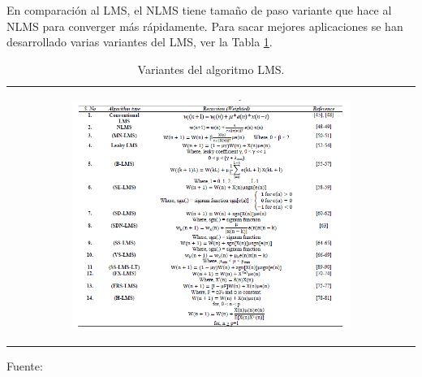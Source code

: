\begin{enumerate}
\begin{enumerate}
\begin{enumerate}
En comparación al LMS, el NLMS tiene tamaño de paso variante que hace al NLMS para converger más rápidamente. Para sacar mejores aplicaciones se han desarrollado varias variantes del LMS, ver la Tabla \ref{table:tabla24}.

\begin{center}
\begin{table}[h!]
\centering
\vskip -0.2cm
\caption{\small{Variantes del algoritmo LMS.}}
\label{table:tabla24}
\begin{tabular}{c}
\begin{minipage}{.9\textwidth}
\begin{center}
\includegraphics[width=0.7\textwidth]{Imagenes/Cap2/image019}
\end{center}
\end{minipage}
\end{tabular}
\begin{center}
\vskip 0.2cm
{\small{Fuente: \cite{shubhra}}}
\end{center}
\end{table}
\end{center}

\end{enumerate}


\end{enumerate}
\end{enumerate}
